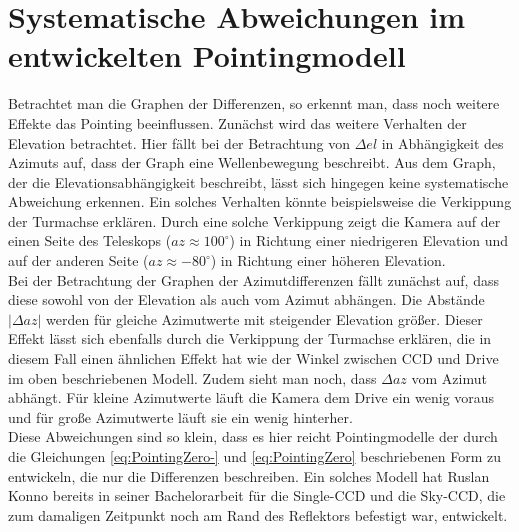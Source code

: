 \section{Systematische Abweichungen im entwickelten Pointingmodell}
Betrachtet man die Graphen der Differenzen, so erkennt man, dass noch weitere Effekte das Pointing beeinflussen. Zunächst wird das weitere Verhalten der Elevation betrachtet. Hier fällt bei der Betrachtung von $\Delta el$ in Abhängigkeit des Azimuts auf, dass der Graph eine Wellenbewegung beschreibt. Aus dem Graph, der die Elevationsabhängigkeit beschreibt, lässt sich hingegen keine systematische Abweichung erkennen. Ein solches Verhalten könnte beispielsweise die Verkippung der Turmachse erklären. Durch eine solche Verkippung zeigt die Kamera auf der einen Seite des Teleskops ($az\approx100^{\circ}$) in Richtung einer niedrigeren Elevation und auf der anderen Seite ($az\approx-80^{\circ}$) in Richtung einer höheren Elevation.\\
Bei der Betrachtung der Graphen der Azimutdifferenzen fällt zunächst auf, dass diese sowohl von der Elevation als auch vom Azimut abhängen. Die Abstände $\left| \Delta az \right|$ werden für gleiche Azimutwerte mit steigender Elevation größer. Dieser Effekt lässt sich ebenfalls durch die Verkippung der Turmachse erklären, die in diesem Fall einen ähnlichen Effekt hat wie der Winkel zwischen CCD und Drive im oben beschriebenen Modell. Zudem sieht man noch, dass $\Delta az$ vom Azimut abhängt. Für kleine Azimutwerte läuft die Kamera dem Drive ein wenig voraus und für große Azimutwerte läuft sie ein wenig hinterher.\\
Diese Abweichungen sind so klein, dass es hier reicht Pointingmodelle der durch die Gleichungen \ref{eq:PointingZero-} und \ref{eq:PointingZero} beschriebenen Form zu entwickeln, die nur die Differenzen beschreiben. Ein solches Modell hat Ruslan Konno bereits in seiner Bachelorarbeit für die Single-CCD und die Sky-CCD, die zum damaligen Zeitpunkt noch am Rand des Reflektors befestigt war, entwickelt. 
